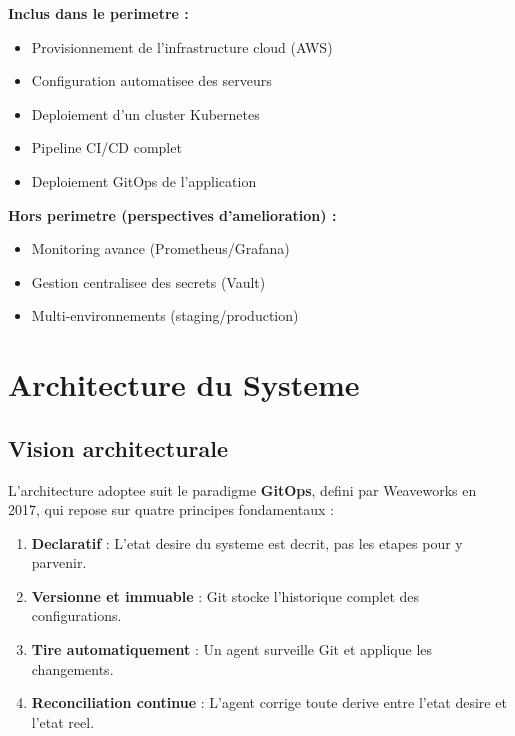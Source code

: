 \documentclass[12pt,a4paper,french]{report}
\begin{document}
\textbf{Inclus dans le perimetre :}
\begin{itemize}
    \item Provisionnement de l'infrastructure cloud (AWS)
    \item Configuration automatisee des serveurs
    \item Deploiement d'un cluster Kubernetes
    \item Pipeline CI/CD complet
    \item Deploiement GitOps de l'application
\end{itemize}

\textbf{Hors perimetre (perspectives d'amelioration) :}
\begin{itemize}
    \item Monitoring avance (Prometheus/Grafana)
    \item Gestion centralisee des secrets (Vault)
    \item Multi-environnements (staging/production)
\end{itemize}

\chapter{Architecture du Systeme}

\section{Vision architecturale}

L'architecture adoptee suit le paradigme \textbf{GitOps}, defini par Weaveworks en 2017, qui repose sur quatre principes fondamentaux :

\begin{enumerate}
    \item \textbf{Declaratif} : L'etat desire du systeme est decrit, pas les etapes pour y parvenir.
    \item \textbf{Versionne et immuable} : Git stocke l'historique complet des configurations.
    \item \textbf{Tire automatiquement} : Un agent surveille Git et applique les changements.
    \item \textbf{Reconciliation continue} : L'agent corrige toute derive entre l'etat desire et l'etat reel.
\end{enumerate}
\end{document}
